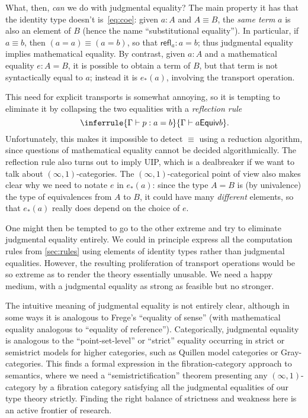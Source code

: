 \documentclass[12pt]{article}
\let\jdeq\equiv
\def\oo{\ensuremath{\infty}}
\def\io{\ensuremath{(\oo,1)}}
\def\refl{\mathsf{refl}}
\def\types{\vdash}
\def\equiv{\mathsf{Equiv}}
\numberwithin{equation}{section}
\begin{document}
\begin{subappendices}
What, then, \emph{can} we do with judgmental equality?
The main property it has that the identity type doesn't is~\eqref{eq:coe}: given $a:A$ and $A\jdeq B$, the \emph{same term} $a$ is also an element of $B$ (hence the name ``substitutional equality'').
In particular, if $a\jdeq b$, then $(a=a)\jdeq (a=b)$, so that $\refl_a : a=b$;
thus judgmental equality implies mathematical equality.
By contrast, given $a:A$ and a mathematical equality $e:A=B$, it is possible to obtain a term of $B$, but that term is not syntactically equal to $a$; instead it is $e_*(a)$, involving the transport operation.

This need for explicit transports is somewhat annoying, so it is tempting to eliminate it by collapsing the two equalities with a \emph{reflection rule}
\[ \inferrule{\Gamma \types p:a=b}{\Gamma\types a\jdeq b}. \]
Unfortunately, this makes it impossible to detect $\jdeq$ using a reduction algorithm, since questions of mathematical equality cannot be decided algorithmically.
The reflection rule also turns out to imply UIP, which is %
a dealbreaker if we want to talk about \io-categories.
The \io-categorical point of view also makes clear why we need to notate $e$ in $e_*(a)$: since the type $A=B$ is (by univalence) the type of equivalences from $A$ to $B$, it could have many \emph{different} elements, so that $e_*(a)$ really does depend on the choice of $e$.

One might then be tempted to go to the other extreme and try to eliminate judgmental equality entirely.
We could in principle express all the computation rules from \cref{sec:rules} using elements of identity types rather than judgmental equalities.
However, the resulting proliferation of transport operations would be so extreme as to render the theory essentially unusable.
We need a happy medium, with a judgmental equality as strong as feasible but no stronger.

The intuitive meaning of judgmental equality is not entirely clear, although in some ways it is analogous to Frege's ``equality of sense'' (with mathematical equality analogous to ``equality of reference'').
Categorically, judgmental equality is analogous to the ``point-set-level'' or ``strict'' equality occurring in strict or semistrict models for higher categories, such as Quillen model categories or Gray-categories.
This finds a formal expression in the fibration-category approach to semantics, where we need a ``semistrictification'' theorem presenting any \io-category by a fibration category satisfying all the judgmental equalities of our type theory strictly.
Finding the right balance of strictness and weakness here is an active frontier of research.


\end{subappendices}
\end{document}
